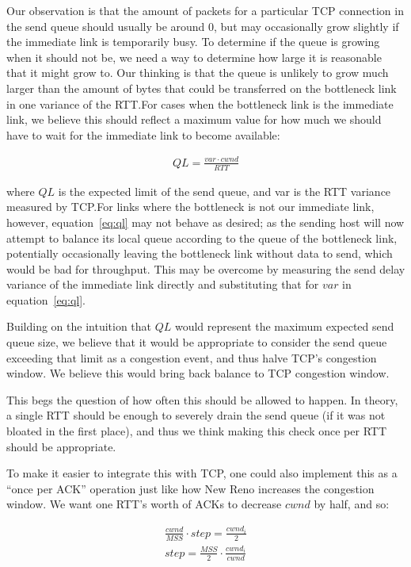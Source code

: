 Our observation is that the amount of packets for a particular TCP connection in
the send queue should usually be around 0, but may occasionally grow slightly if
the immediate link is temporarily busy. To determine if the queue is growing
when it should not be, we need a way to determine how large it is reasonable
that it might grow to. Our thinking is that the queue is unlikely to grow much
larger than the amount of bytes that could be transferred on the bottleneck link
in one variance of the RTT.\@ For cases when the bottleneck link is the
immediate link, we believe this should reflect a maximum value for how much we
should have to wait for the immediate link to become available:

\begin{align}
  QL = \frac{var \cdot cwnd}{RTT}\label{eq:ql}
\end{align}

where $QL$ is the expected limit of the send queue, and var is the RTT variance
measured by TCP.\@ For links where the bottleneck is not our immediate link,
however, equation~\ref{eq:ql} may not behave as desired; as the sending host
will now attempt to balance its local queue according to the queue of the
bottleneck link, potentially occasionally leaving the bottleneck link without
data to send, which would be bad for throughput. This may be overcome by
measuring the send delay variance of the immediate link directly and
substituting that for $var$ in equation~\ref{eq:ql}.

Building on the intuition that $QL$ would represent the maximum expected send
queue size, we believe that it would be appropriate to consider the send queue
exceeding that limit as a congestion event, and thus halve TCP's congestion
window. We believe this would bring back balance to TCP congestion window.

This begs the question of how often this should be allowed to happen. In theory,
a single RTT should be enough to severely drain the send queue (if it was not
bloated in the first place), and thus we think making this check once per RTT
should be appropriate.

To make it easier to integrate this with TCP, one could also implement this as a
``once per ACK'' operation just like how New Reno increases the congestion
window. We want one RTT's worth of ACKs to decrease $cwnd$ by half, and so:

\begin{align}
  \frac{cwnd}{MSS} \cdot step = \frac{cwnd_i}{2} \\
  step = \frac{MSS}{2} \cdot \frac{cwnd_i}{cwnd}
\end{align}

